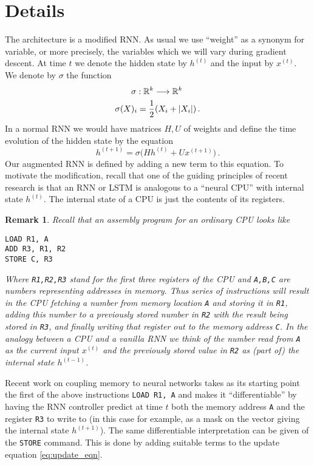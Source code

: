 \documentclass[english,letter paper,12pt,leqno]{article}
\theoremstyle{example}
\newtheorem{remark}[theorem]{Remark}
\numberwithin{equation}{section}
\def\be{\begin{equation}}
\def\ee{\end{equation}}
\begin{document}
\section{Details}

The architecture is a modified RNN. As usual we use ``weight'' as a synonym for variable, or more precisely, the variables which we will vary during gradient descent. At time $t$ we denote the hidden state by $h^{(t)}$ and the input by $x^{(t)}$. We denote by $\sigma$ the function
\begin{gather*}
\sigma: \mathbb{R}^k \longrightarrow \mathbb{R}^k\,\\
\sigma( X )_i = \frac{1}{2}( X_i + |X_i| )\,.
\end{gather*}
In a normal RNN we would have matrices $H, U$ of weights and define the time evolution of the hidden state by the equation
\be\label{eq:update_eqn}
h^{(t+1)} = \sigma\big( H h^{(t)} + U x^{(t+1)} \big)\,.
\ee
Our augmented RNN is defined by adding a new term to this equation. To motivate the modification, recall that one of the guiding principles of recent research is that an RNN or LSTM is analogous to a ``neural CPU'' with internal state $h^{(t)}$. The internal state of a CPU is just the contents of its registers. 

\begin{remark}
Recall that an assembly program for an ordinary CPU looks like
\begin{verbatim}
LOAD R1, A
ADD R3, R1, R2
STORE C, R3
\end{verbatim}
Where \verb+R1,R2,R3+ stand for the first three registers of the CPU and \verb+A,B,C+ are numbers representing addresses in memory. Thus series of instructions will result in the CPU fetching a number from memory location \verb+A+ and storing it in \verb+R1+, adding this number to a previously stored number in \verb+R2+ with the result being stored in \verb+R3+, and finally writing that register out to the memory address \verb+C+. In the analogy between a CPU and a vanilla RNN we think of the number read from \verb+A+ as the current input $x^{(t)}$ and the previously stored value in \verb+R2+ as (part of) the internal state $h^{(t-1)}$.
\end{remark}

Recent work \cite{??,??} on coupling memory to neural networks takes as its starting point the first of the above instructions \verb+LOAD R1, A+ and makes it ``differentiable'' by having the RNN controller predict at time $t$ both the memory address \verb+A+ and the register \verb+R3+ to write to (in this case for example, as a mask on the vector giving the internal state $h^{(t+1)}$). The same differentiable interpretation can be given of the \verb+STORE+ command. This is done by adding suitable terms to the update equation \eqref{eq:update_eqn}.
\end{document}
